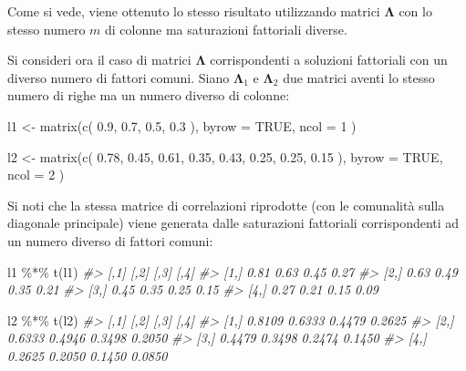 \documentclass[
  11pt,
]{krantz}
\makeatletter
\newenvironment{Shaded}{\begin{snugshade}}{\end{snugshade}}
\newcommand{\AttributeTok}[1]{\textcolor[rgb]{0.61,0.61,0.61}{#1}}
\newcommand{\CommentTok}[1]{\textcolor[rgb]{0.37,0.37,0.37}{\textit{#1}}}
\newcommand{\ConstantTok}[1]{\textcolor[rgb]{0,0,0}{#1}}
\newcommand{\DecValTok}[1]{\textcolor[rgb]{0.06,0.06,0.06}{#1}}
\newcommand{\FloatTok}[1]{\textcolor[rgb]{0.06,0.06,0.06}{#1}}
\newcommand{\FunctionTok}[1]{\textcolor[rgb]{0,0,0}{#1}}
\newcommand{\NormalTok}[1]{#1}
\newcommand{\OtherTok}[1]{\textcolor[rgb]{0.37,0.37,0.37}{#1}}
\newcommand{\SpecialCharTok}[1]{\textcolor[rgb]{0,0,0}{#1}}
\newenvironment{kframe}{%
\medskip{}
\setlength{\fboxsep}{.8em}
 \def\at@end@of@kframe{}%
 \ifinner\ifhmode%
  \def\at@end@of@kframe{\end{minipage}}%
  \begin{minipage}{\columnwidth}%
 \fi\fi%
 \def\FrameCommand##1{\hskip\@totalleftmargin \hskip-\fboxsep
 \colorbox{shadecolor}{##1}\hskip-\fboxsep
     \hskip-\linewidth \hskip-\@totalleftmargin \hskip\columnwidth}%
 \MakeFramed {\advance\hsize-\width
   \@totalleftmargin\z@ \linewidth\hsize
   \@setminipage}}%
 {\par\unskip\endMakeFramed%
 \at@end@of@kframe}
\renewenvironment{Shaded}{\begin{kframe}}{\end{kframe}}
\theoremstyle{definition}
\theoremstyle{definition}
\theoremstyle{definition}
\theoremstyle{definition}
\theoremstyle{remark}
\makeatother
\begin{document}
Come si vede, viene ottenuto lo stesso risultato utilizzando matrici \(\boldsymbol{\Lambda}\) con lo stesso numero \(m\) di colonne ma saturazioni fattoriali diverse.

Si consideri ora il caso di matrici \(\boldsymbol{\Lambda}\) corrispondenti a soluzioni fattoriali con un diverso numero di fattori comuni. Siano \(\boldsymbol{\Lambda}_1\) e \(\boldsymbol{\Lambda}_2\) due matrici aventi lo stesso numero di righe ma un numero diverso di colonne:

\begin{Shaded}
\begin{Highlighting}[]
\NormalTok{l1 }\OtherTok{\textless{}{-}} \FunctionTok{matrix}\NormalTok{(}\FunctionTok{c}\NormalTok{(}
  \FloatTok{0.9}\NormalTok{,}
  \FloatTok{0.7}\NormalTok{,}
  \FloatTok{0.5}\NormalTok{,}
  \FloatTok{0.3}
\NormalTok{),}
\AttributeTok{byrow =} \ConstantTok{TRUE}\NormalTok{, }\AttributeTok{ncol =} \DecValTok{1}
\NormalTok{)}

\NormalTok{l2 }\OtherTok{\textless{}{-}} \FunctionTok{matrix}\NormalTok{(}\FunctionTok{c}\NormalTok{(}
  \FloatTok{0.78}\NormalTok{, }\FloatTok{0.45}\NormalTok{,}
  \FloatTok{0.61}\NormalTok{, }\FloatTok{0.35}\NormalTok{,}
  \FloatTok{0.43}\NormalTok{, }\FloatTok{0.25}\NormalTok{,}
  \FloatTok{0.25}\NormalTok{, }\FloatTok{0.15}
\NormalTok{),}
\AttributeTok{byrow =} \ConstantTok{TRUE}\NormalTok{, }\AttributeTok{ncol =} \DecValTok{2}
\NormalTok{)}
\end{Highlighting}
\end{Shaded}

Si noti che la stessa matrice di correlazioni riprodotte (con le comunalità sulla diagonale principale) viene generata dalle saturazioni fattoriali corrispondenti ad un numero diverso di fattori comuni:

\begin{Shaded}
\begin{Highlighting}[]
\NormalTok{l1 }\SpecialCharTok{\%*\%} \FunctionTok{t}\NormalTok{(l1)}
\CommentTok{\#\textgreater{}      [,1] [,2] [,3] [,4]}
\CommentTok{\#\textgreater{} [1,] 0.81 0.63 0.45 0.27}
\CommentTok{\#\textgreater{} [2,] 0.63 0.49 0.35 0.21}
\CommentTok{\#\textgreater{} [3,] 0.45 0.35 0.25 0.15}
\CommentTok{\#\textgreater{} [4,] 0.27 0.21 0.15 0.09}
\end{Highlighting}
\end{Shaded}

\begin{Shaded}
\begin{Highlighting}[]
\NormalTok{l2 }\SpecialCharTok{\%*\%} \FunctionTok{t}\NormalTok{(l2)}
\CommentTok{\#\textgreater{}        [,1]   [,2]   [,3]   [,4]}
\CommentTok{\#\textgreater{} [1,] 0.8109 0.6333 0.4479 0.2625}
\CommentTok{\#\textgreater{} [2,] 0.6333 0.4946 0.3498 0.2050}
\CommentTok{\#\textgreater{} [3,] 0.4479 0.3498 0.2474 0.1450}
\CommentTok{\#\textgreater{} [4,] 0.2625 0.2050 0.1450 0.0850}
\end{Highlighting}
\end{Shaded}
\end{document}
